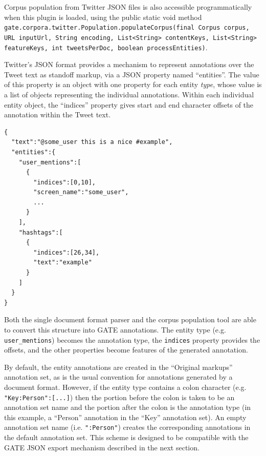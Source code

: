 Corpus population from Twitter JSON files is also accessible programmatically
when this plugin is loaded, using the public static void method
\texttt{gate.corpora.twitter.Population.populateCorpus(final Corpus corpus, URL
  inputUrl, String encoding, List<String> contentKeys, List<String> featureKeys,
  int tweetsPerDoc, boolean processEntities)}.


Twitter's JSON format provides a mechanism to represent annotations over the
Tweet text as standoff markup, via a JSON property named ``entities''.  The
value of this property is an object with one property for each entity
\emph{type}, whose value is a list of objects representing the individual
annotations.  Within each individual entity object, the ``indices'' property
gives start and end character offsets of the annotation within the Tweet text.

\begin{verbatim}
{
  "text":"@some_user this is a nice #example",
  "entities":{
    "user_mentions":[
      {
        "indices":[0,10],
        "screen_name":"some_user",
        ...
      }
    ],
    "hashtags":[
      {
        "indices":[26,34],
        "text":"example"
      }
    ]
  }
}
\end{verbatim}

Both the single document format parser and the corpus population tool are able
to convert this structure into GATE annotations.  The entity type (e.g.
\verb!user_mentions!) becomes the annotation type, the \verb!indices!  property
provides the offsets, and the other properties become features of the generated
annotation.

By default, the entity annotations are created in the ``Original markups''
annotation set, as is the usual convention for annotations generated by a
document format.  However, if the entity type contains a colon character (e.g.
\verb!"Key:Person":[...]!) then the portion before the colon is taken to be an
annotation set name and the portion after the colon is the annotation type (in
this example, a ``Person'' annotation in the ``Key'' annotation set).  An
empty annotation set name (i.e. \verb!":Person"!) creates the corresponding
annotations in the default annotation set.  This scheme is designed to be
compatible with the GATE JSON export mechanism described in the next section.


